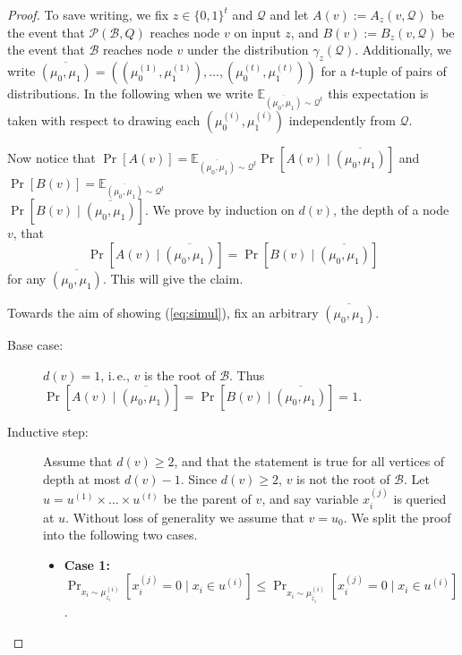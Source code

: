 \documentclass[11pt]{article}
\numberwithin{equation}{section}
\theoremstyle{definition}
\theoremstyle{plain}
\newcommand{\ie}{i.\,e.}
\newcommand{\clB}{\mathcal{B}}
\newcommand{\clQ}{\mathcal{Q}}
\newcommand{\clP}{\mathcal{P}}
\newcommand{\E}{\mathbb{E}}
\begin{document}
\begin{proof}	
To save writing, we fix $z \in \{0,1\}^t$ and $\clQ$ and let $A(v) := A_z(v, \clQ)$ be the 
event that $\clP(\clB,Q)$ reaches node $v$ on input $z$, and $B(v):=B_z(v,\clQ)$ be the event that $\clB$ reaches node $v$ under the distribution
$\gamma_z(\clQ)$.  Additionally, we write $\overline{(\mu_0, \mu_1)} = ((\mu_0^{(1)}, \mu_1^{(1)}), \ldots, (\mu_0^{(t)}, \mu_1^{(t)}))$ for a $t$-tuple of 
pairs of distributions.  In the following when we write $\E_{\overline{(\mu_0, \mu_1)} \sim \clQ^t}$ this expectation is taken with respect to drawing each 
$(\mu_0^{(i)}, \mu_1^{(i)})$ independently from $\clQ$.

Now notice that $\Pr[A(v)] = \E_{\overline{(\mu_0, \mu_1)}\sim \clQ^t} \Pr[A(v) \mid \overline{(\mu_0, \mu_1)}]$ and 
$\Pr[B(v)] = \E_{\overline{(\mu_0, \mu_1)} \sim \clQ^t}$ \\ $\Pr[B(v) \mid \overline{(\mu_0, \mu_1)}]$.  We prove by induction on $d(v)$, the depth of a node $v$, that
\begin{equation}
\label{eq:simul}
\Pr[A(v) \mid \overline{(\mu_0, \mu_1)}]=\Pr[B(v) \mid \overline{(\mu_0, \mu_1)}]
\end{equation}
for any $\overline{(\mu_0, \mu_1)}$.  This will give the claim. 

Towards the aim of showing (\ref{eq:simul}), fix an arbitrary $\overline{(\mu_0, \mu_1)}$.

\begin{description}

\item[Base case:] $d(v)=1$, \ie, $v$ is the root of $\clB$. Thus $\Pr[A(v) \mid \overline{(\mu_0, \mu_1)}]=\Pr[B(v) \mid \overline{(\mu_0, \mu_1)}]=1$.

\item[Inductive step:] Assume that $d(v) \geq 2$, and that the statement is true for all vertices of depth at most $d(v)-1$. Since $d(v) \geq 2$, $v$ is not the root of $\clB$. Let $u=u^{(1)} \times \ldots \times u^{(t)}$ be the parent of 
$v$, and say variable $x_i^{(j)}$ is queried at $u$. Without loss of generality we assume that $v=u_0$. We split the proof into the following two cases.
\begin{itemize}
\item {\bf Case 1:} $\Pr_{x_i \sim \mu_{z_i}^{(i)}}[x_i^{(j)}=0 \mid x_i \in u^{(i)}] \leq \Pr_{x_i \sim \mu_{\overline{z}_i}^{(i)}}[x_i^{(j)}=0 \mid x_i \in u^{(i)}]$.


\end{itemize}
\end{description}
\end{proof}
\end{document}

